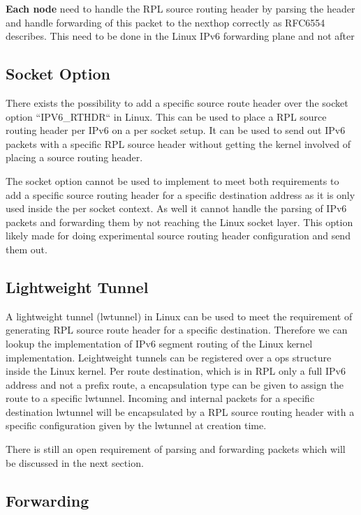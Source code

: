 \documentclass[letterpaper]{article}
\begin{document}
{\bf Each node} need to handle the RPL source routing header by parsing the header and handle forwarding of this packet to the nexthop correctly as RFC6554 describes.
This need to be done in the Linux IPv6 forwarding plane and not after 

\subsection{Socket Option}

There exists the possibility to add a specific source route header over the socket option ``IPV6\_RTHDR`` in Linux.
This can be used to place a RPL source routing header per IPv6 on a per socket setup.
It can be used to send out IPv6 packets with a specific RPL source header without getting the kernel involved of placing a source routing header.

The socket option cannot be used to implement to meet both requirements to add a specific source routing header for a specific destination address as it is only used inside the per socket context.
As well it cannot handle the parsing of IPv6 packets and forwarding them by not reaching the Linux socket layer.
This option likely made for doing experimental source routing header configuration and send them out.

\subsection{Lightweight Tunnel}

A lightweight tunnel (lwtunnel) in Linux can be used to meet the requirement of generating RPL source route header for a specific destination.
Therefore we can lookup the implementation of IPv6 segment routing \cite{srh} of the Linux kernel implementation.
Leightweight tunnels can be registered over a ops structure inside the Linux kernel.
Per route destination, which is in RPL only a full IPv6 address and not a prefix route, a encapsulation type can be given to assign the route to a specific lwtunnel.
Incoming and internal packets for a specific destination lwtunnel will be encapsulated by a RPL source routing header with a specific configuration given by the lwtunnel at creation time.

There is still an open requirement of parsing and forwarding packets which will be discussed in the next section.

\subsection{Forwarding}
\end{document}
